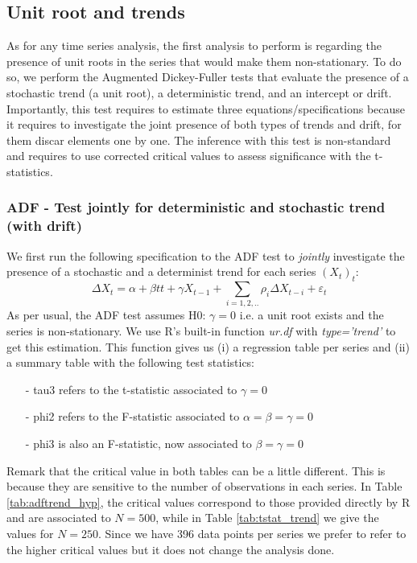 \documentclass[hidelinks,12pts]{article}
\DeclareMathOperator{\1}{\mathbbm{1}}
\begin{document}
    \subsection{Unit root and trends}

As for any time series analysis, the first analysis to perform is regarding the presence of unit roots in the series that would make them non-stationary. 
To do so, we perform the Augmented Dickey-Fuller tests that evaluate the presence of a stochastic trend (a unit root), a deterministic trend, and an intercept or drift. 
Importantly, this test requires to estimate three equations/specifications because it requires to investigate the joint presence of both types of trends and drift, for them discar elements one by one. 
The inference with this test is non-standard and requires to use corrected critical values to assess significance with the t-statistics. 




\subsubsection{ADF - Test jointly for deterministic and stochastic trend (with drift)}

We first run the following specification to the ADF test to \emph{jointly} investigate the presence of a stochastic and a determinist trend for each series $(X_t)_t$: 
    \begin{equation}
        \Delta X_t = \alpha + \beta tt + \gamma X_{t-1} +\sum_{i=1,2,..}\rho_i \Delta X_{t-i} + \varepsilon_t
    \end{equation}
As per usual, the ADF test assumes H0: $\gamma =0$ i.e. a unit root exists and the series is non-stationary.
We use R's built-in function \emph{ur.df} with \emph{type='trend'} to get this estimation. This function gives us (i) a regression table per series and (ii) a summary table with the following test statistics: 
    \begin{itemize}
        \item[-] tau3 refers to the t-statistic associated to $\gamma =0$ 
        \item[-] phi2 refers to the F-statistic associated to $\alpha = \beta = \gamma =0$
        \item[-] phi3 is also an F-statistic, now associated to $\beta =\gamma = 0$  
    \end{itemize}
Remark that the critical value in both tables can be a little different. This is because they are sensitive to the number of observations in each series. In Table \ref{tab:adftrend_hyp}, the critical values correspond to those provided directly by R and are associated to $N=500$, while in Table \ref{tab:tstat_trend} we give the values for $N=250$. Since we have 396 data points per series we prefer to refer to the higher critical values but it does not change the analysis done.
\end{document}
